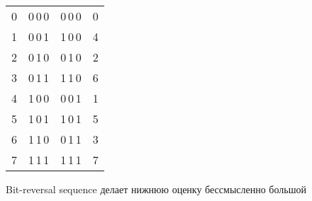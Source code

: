 \begin{figure}[h] \centering
\begin{tabular}{|c|c|c|c|} \hline
0 & 0\,0\,0 & 0\,0\,0 & 0 \\
1 & 0\,0\,1 & 1\,0\,0 & 4 \\
2 & 0\,1\,0 & 0\,1\,0 & 2 \\
3 & 0\,1\,1 & 1\,1\,0 & 6 \\
4 & 1\,0\,0 & 0\,0\,1 & 1 \\
5 & 1\,0\,1 & 1\,0\,1 & 5 \\
6 & 1\,1\,0 & 0\,1\,1 & 3 \\
7 & 1\,1\,1 & 1\,1\,1 & 7 \\ \hline
\end{tabular}
	\caption{Bit-reversal sequence делает нижнюю оценку бессмысленно большой}
	\label{fig:brs}
\end{figure}